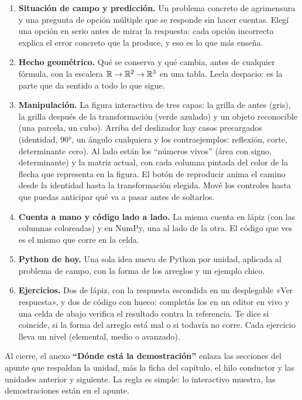 \documentclass[11pt,a4paper]{report}
\newcommand{\clave}[1]{\texttt{\detokenize{#1}}}
\begin{document}
\begin{enumerate}[start=0]
  \item \textbf{Situación de campo y predicción.} Un problema concreto de agrimensura y una pregunta de opción múltiple que se responde sin hacer cuentas. Elegí una opción en serio antes de mirar la respuesta: cada opción incorrecta explica el error concreto que la produce, y eso es lo que más enseña.
  \item \textbf{Hecho geométrico.} Qué se conserva y qué cambia, antes de cualquier fórmula, con la escalera \(\mathbb{R} \to \mathbb{R}^2 \to \mathbb{R}^3\) en una tabla. Leela despacio: es la parte que da sentido a todo lo que sigue.
  \item \textbf{Manipulación.} La figura interactiva de tres capas: la grilla de antes (gris), la grilla después de la transformación (verde azulado) y un objeto reconocible (una parcela, un cubo). Arriba del deslizador hay casos precargados (identidad, 90°, un ángulo cualquiera y los contraejemplos: reflexión, corte, determinante cero). Al lado están los \enquote{números vivos} (área con signo, determinante) y la matriz actual, con cada columna pintada del color de la flecha que representa en la figura. El botón de reproducir anima el camino desde la identidad hasta la transformación elegida. Mové los controles hasta que puedas anticipar qué va a pasar antes de soltarlos.
  \item \textbf{Cuenta a mano y código lado a lado.} La misma cuenta en lápiz (con las columnas coloreadas) y en NumPy, una al lado de la otra. El código que ves es el mismo que corre en la celda.
  \item \textbf{Python de hoy.} Una sola idea nueva de Python por unidad, aplicada al problema de campo, con la forma de los arreglos y un ejemplo chico.
  \item \textbf{Ejercicios.} Dos de lápiz, con la respuesta escondida en un desplegable «Ver respuesta», y dos de código con hueco: completás los \clave{...} en un editor en vivo y una celda de abajo verifica el resultado contra la referencia. Te dice si coincide, si la forma del arreglo está mal o si todavía no corre. Cada ejercicio lleva un nivel (elemental, medio o avanzado).
\end{enumerate}

Al cierre, el anexo \textbf{\enquote{Dónde está la demostración}} enlaza las secciones del apunte que respaldan la unidad, más la ficha del capítulo, el hilo conductor y las unidades anterior y siguiente. La regla es simple: lo interactivo muestra, las demostraciones están en el apunte.
\end{document}
